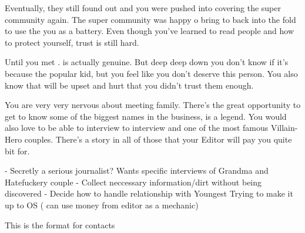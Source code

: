 \documentclass[char]{LRSguildcamp1}
\begin{document}
Eventually, they still found out and you were pushed into covering the super community again. The super community was happy o bring to back into the fold to use the you as a battery. Even though you've learned to read people and how to protect yourself, trust is still hard. 

Until you met \cYoungest{}. \cYoungest{} is actually genuine. But deep deep down you don't know if it’s because \cYoungest{}  the popular kid, but you feel like you don't deserve this person. You also know that \cYoungest{} will be upset and hurt that you didn’t trust them enough. 

You are very very nervous about meeting \cYoungest{} family. There’s the great opportunity to get to know some of the biggest names in the business, \cGrandma{} is a legend. You would also love to be able to interview to interview \cOldest and \cOS one of the most famous Villain-Hero couples. There's a story in all of those that your Editor will pay you quite bit for. 



\begin{itemz}[Goals]
	\item 
\end{itemz}

\begin{itemz}[Notes]
	\item 
	- Secretly a serious journalist?  Wants specific interviews of Grandma and Hatefuckery couple 
	- Collect neccessary information/dirt without being discovered
	- Decide how to handle relationship with Youngest 
	Trying to make it up to OS ( can use money from editor as a mechanic)
	
\end{itemz}

\begin{contacts}
	\contact{} This is the format for contacts 
\end{contacts}
\end{document}
